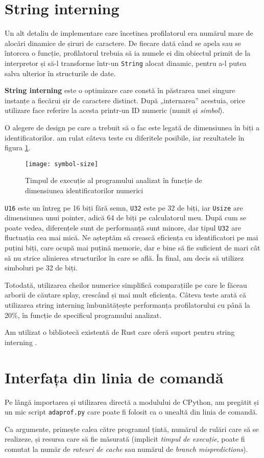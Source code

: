 \section{String interning}

Un alt detaliu de implementare care încetinea profilatorul era numărul mare de alocări dinamice de șiruri de caractere. De fiecare dată când se apela sau se întorcea o funcție, profilatorul trebuia să ia numele ei din obiectul primit de la interpretor și să-l transforme într-un \texttt{String} alocat dinamic, pentru a-l putea salva ulterior în structurile de date. 

\textbf{String interning} este o optimizare care constă în păstrarea unei singure instanțe a fiecărui șir de caractere distinct. După „internarea” acestuia, orice utilizare face referire la acesta printr-un ID numeric (numit și \emph{simbol}).

O alegere de design pe care a trebuit să o fac este legată de dimensiunea în biți a identificatorilor. am rulat câteva teste cu diferitele posibile, iar rezultatele în figura \ref{fig:symbol-size}.

\begin{figure}[htb]
    \centering
    \texttt{[image: symbol-size]}
    \caption{Timpul de execuție al programului analizat în funcție de dimensiunea identificatorilor numerici}
    \label{fig:symbol-size}
\end{figure}

\texttt{U16} este un întreg pe 16 biți fără semn, \texttt{U32} este pe 32 de biți, iar \texttt{Usize} are dimensiunea unui pointer, adică 64 de biți pe calculatorul meu. După cum se poate vedea, diferențele sunt de performanță sunt minore, dar tipul \texttt{U32} are fluctuația cea mai mică. Ne așteptăm să crească eficiența cu identificatori pe mai puțini biți, care ocupă mai puțină memorie, dar e bine să fie suficient de mari cât să nu strice alinierea structurilor în care se află. În final, am decis să utilizez simboluri pe 32 de biți.

Totodată, utilizarea cheilor numerice simplifică comparațiile pe care le făceau arborii de căutare splay, crescând și mai mult eficiența. Câteva teste arată că utilizarea string interning îmbunătățește performanța profilatorului cu până la 20\%, în funcție de specificul programului analizat.

Am utilizat o bibliotecă existentă de Rust care oferă suport pentru string interning \cite{string_interner}.

\section{Interfața din linia de comandă}

Pe lângă importarea și utilizarea directă a modulului de CPython, am pregătit și un mic script \texttt{adaprof.py} care poate fi folosit ca o unealtă din linia de comandă.

Ca argumente, primește calea către programul țintă, numărul de rulări care să se realizeze, și resursa care să fie măsurată (implicit \textit{timpul de execuție}, poate fi comutat la număr de \textit{rateuri de cache} sau numărul de \textit{branch mispredictions}).